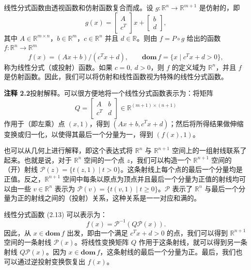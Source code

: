 \documentclass[UTF8,12pt,a4paper,fontset=fandol]{ctexart}
\begin{document}
线性分式函数由透视函数和仿射函数复合而成。设 $g:\mathbb{R}^n\to\mathbb{R}^{m+1}$ 是仿射的，即
\begin{equation}
  g(x)=
  \begin{bmatrix}
    A\\
    c^T
  \end{bmatrix}x+
  \begin{bmatrix}
    b\\
    d
  \end{bmatrix},
  \tag{2.12}
\end{equation}
其中 $A\in\mathbb{R}^{m\times n}$，$b\in\mathbb{R}^m$，$c\in\mathbb{R}^n$ 并且 $d\in\mathbb{R}$。则由 $f=P\circ g$ 给出的函数 $f:\mathbb{R}^n\to\mathbb{R}^m$
\begin{equation}
  f(x)=(Ax+b)/(c^Tx+d),\qquad
  \mathbf{dom}\,f=\{x\mid c^Tx+d>0\},
  \tag{2.13}
\end{equation}
称为线性分式（或投射）函数。如果 $c=0,\ d>0$，则 $f$ 的定义域为 $\mathbb{R}^n$，并且 $f$ 是仿射函数。因此，我们可以将仿射和线性函数视为特殊的线性分式函数。

\noindent\textbf{注释 2.2}\quad 投射解释。可以很方便地将一个线性分式函数表示为：将矩阵
\begin{equation}
  Q=
  \begin{bmatrix}
    A & b\\
    c^T & d
  \end{bmatrix}\in\mathbb{R}^{(m+1)\times(n+1)}
  \tag{2.14}
\end{equation}
作用于（即左乘）点 $(x,1)$，得到 $(Ax+b,c^Tx+d)$；然后将所得结果做伸缩变换或归一化，以使得其最后一个分量为一，得到 $(f(x),1)$。

也可以从几何上进行解释，即这个表达式将 $\mathbb{R}^n$ 与 $\mathbb{R}^{n+1}$ 空间上的一组射线联系了起来。也就是说，对于 $\mathbb{R}^n$ 空间的一个点 $z$，我们可以构造一个 $\mathbb{R}^{n+1}$ 空间的（开）射线 $\mathcal{P}(z)=\{t(z,1)\mid t>0\}$。这条射线上每个点的最后一个分量均是正值。反之，$\mathbb{R}^{n+1}$ 空间中每条以原点为顶点并且最后一个分量为正值的射线均可以由一些 $v\in\mathbb{R}^n$ 表示为 $\mathcal{P}(v)=\{t(v,1)\mid t\ge 0\}$。$\mathcal{P}$ 表示了 $\mathbb{R}^n$ 与最后一个分量为正的射线之间的（投射）关系，这种关系是一一对应和满的。

线性分式函数 (2.13) 可以表示为：
\[
  f(x)=\mathcal{P}^{-1}(Q\mathcal{P}(x)).
\]
因此，从 $x\in\mathbf{dom}\,f$ 出发，即由一个满足 $c^Tx+d>0$ 的点，我们可以得到 $\mathbb{R}^{n+1}$ 空间的一条射线 $\mathcal{P}(x)$。将线性变换矩阵 $Q$ 作用于这条射线，就可以得到另一条射线 $Q\mathcal{P}(x)$。因为 $x\in\mathbf{dom}\,f$，这条射线的最后一个分量为正。最后，我们也可以通过逆投射变换恢复出 $f(x)$。
\end{document}
